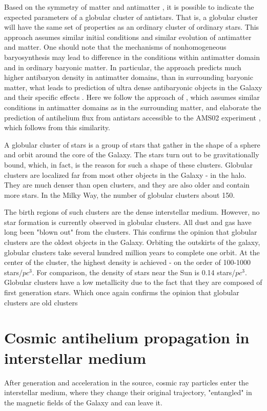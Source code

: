 \documentclass{article}
\begin{document}
Based on the symmetry of matter and antimatter \cite{experiments}, it is possible to indicate the expected parameters of a globular cluster of antistars. That is, a globular cluster will have the same set of properties as an ordinary cluster of ordinary stars. This approach assumes similar initial conditions and similar evolution of antimatter and matter. One should note that the mechanisms of nonhomogeneous baryosynthesis may lead to difference in the conditions within antimatter domain and in ordinary baryonic matter. In particular, the approach \cite{Dolgov3,Blinnikov} predicts much higher antibaryon density in antimatter domains, than in surrounding baryonic matter, what leads to prediction of ultra dense antibaryonic objects in the Galaxy and their specific effects \cite{Blinnikov}. Here we follow the approach of \cite{KRS2}, which assumes similar conditions in antimatter domains as in the surrounding matter, and elaborate the prediction of antihelium flux from antistars accessible to the AMS02 experiment \cite{AMS}, which follows from this similarity. 


A globular cluster of stars is a group of stars that gather in the shape of a sphere and orbit around the core of the Galaxy.
The stars turn out to be gravitationally bound, which, in fact, is the reason for such a shape of these clusters. Globular clusters are localized far from most other objects in the Galaxy - in the halo. They are much denser than open clusters, and they are also older and contain more stars.
In the Milky Way, the number of globular clusters about 150.


The birth regions of such clusters are the dense interstellar medium. However, no star formation is currently observed in globular clusters. All dust and gas have long been "blown out" from the clusters.
This confirms the opinion that globular clusters are the oldest objects in the Galaxy\cite{cluster1}.
Orbiting the outskirts of the galaxy, globular clusters take several hundred million years to complete one orbit.
At the center of the cluster, the highest density is achieved - on the order of 100-1000 stars/$pc^3$. For comparison, the density of stars near the Sun is 0.14 stars/$pc^3$.
Globular clusters have a low metallicity due to the fact that they are composed of first generation stars. Which once again confirms the opinion that globular clusters are old clusters \cite{cluster2}


\section{Cosmic  antihelium propagation in interstellar medium}
After generation and acceleration in the source, cosmic ray particles enter the interstellar medium, where they change their original trajectory, "entangled" in the magnetic fields of the Galaxy and can leave it.
\end{document}
